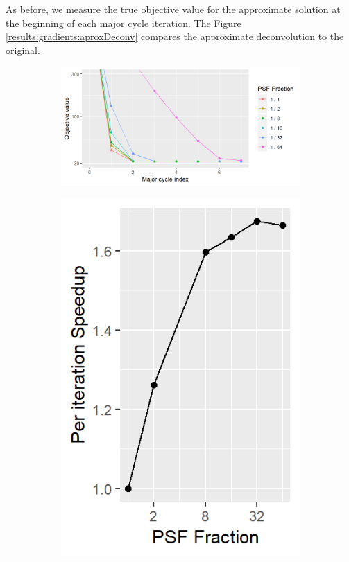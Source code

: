 As before, we measure the true objective value for the approximate solution at the beginning of each major cycle iteration. The Figure \ref{results:gradients:aproxDeconv} compares the approximate deconvolution to the original.

\begin{figure}[h]
	\centering
	\begin{subfigure}[b]{0.58\linewidth}
		\includegraphics[width=\linewidth]{./chapters/10.results/gradient/ApproxDeconv/size.png}
	\end{subfigure}
	\begin{subfigure}[b]{0.195\linewidth}
		\includegraphics[width=\linewidth]{./chapters/10.results/gradient/ApproxDeconv/speedup_iter.png}

\end{subfigure}
\end{figure}
